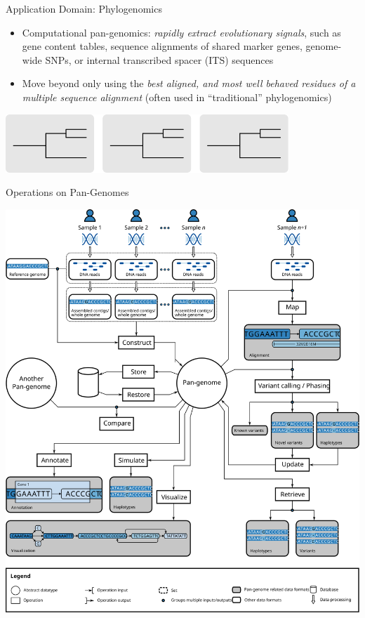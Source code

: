\documentclass[notes=hide]{beamer}
\newcommand{\0}{\ensuremath{\mathtt{0}}}
\newcommand{\1}{\ensuremath{\mathtt{1}}}
\begin{document}
\begin{frame}{Application Domain: Phylogenomics}
\begin{itemize}
 \item Computational pan-genomics: \emph{rapidly extract evolutionary signals}, such as gene content tables, sequence alignments of shared marker genes, genome-wide SNPs, or internal transcribed spacer (ITS) sequences
 \item Move beyond only using the \emph{best aligned, and most well behaved residues of a multiple sequence alignment} (often used in ``traditional'' phylogenomics)
\end{itemize}
\begin{center}
\includegraphics[width=0.8\textwidth]{figs/data-sources-phylo}
\end{center}
\end{frame}

\begin{frame}{Operations on Pan-Genomes}
\begin{center}
\includegraphics[width=.78\textwidth]{figs/paper/operations}
\end{center}
\end{frame}
\end{document}
